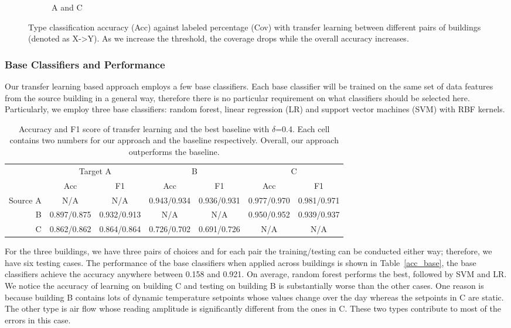 \begin{figure}[ht!]
\begin{subfigure}{0.32\textwidth}
                \caption{A and C}
  \end{subfigure}
\caption{Type classification accuracy (Acc) against labeled percentage (Cov) with transfer learning between different pairs of buildings (denoted as X->Y). As we increase the threshold, the coverage drops while the overall accuracy increases. }
\label{fig:tl_acc}
\end{figure}


\subsubsection{Base Classifiers and Performance}
\label{sec:baseline}
Our transfer learning based approach employs a few base classifiers. Each base classifier will be trained on the same set of data features from the source building in a general way, therefore there is no particular requirement on what classifiers should be selected here.
Particularly, we employ three base classifiers: random forest, linear regression (LR) and support vector machines (SVM) with RBF kernels.


\begin{table}[]
\centering
\begin{tabular}{r|c|c|c|c|c|c}
\hline
\multirow{2}{*}{} & \multicolumn{2}{c|}{Target A} & \multicolumn{2}{c|}{B} & \multicolumn{2}{c}{C} \\ \cline{2-7} 
                  & Acc        & F1        & Acc        & F1        & Acc        & F1        \\ \hline
Source A                 & N/A      & N/A     & 0.943/0.934      & 0.936/0.931     & 0.977/0.970      & 0.981/0.971     \\ \hline
B                 & 0.897/0.875     & 0.932/0.913     & N/A      & N/A     & 0.950/0.952      & 0.939/0.937     \\ \hline
C                 & 0.862/0.862     & 0.864/0.864     & 0.726/0.702      & 0.691/0.726     & N/A     & N/A     \\ \hline
\end{tabular}
\caption{Accuracy and F1 score of transfer learning and the best baseline with $\delta$=0.4. Each cell contains two numbers for our approach and the baseline respectively. Overall, our approach outperforms the baseline.}
\label{table:f1}
\end{table}

For the three buildings, we have three pairs of choices and for each pair the training/testing can be conducted either way; therefore, we have six testing cases.
The performance of the base classifiers when applied across buildings is shown in Table~\ref{acc_base}, the base classifiers achieve the accuracy anywhere between 0.158 and 0.921.
On average, random forest performs the best, followed by SVM and LR. 
We notice the accuracy of learning on building C and testing on building B is substantially worse than the other cases. 
One reason is because building B contains lots of dynamic temperature setpoints whose values change over the day whereas the setpoints in C are static. The other type is air flow whose reading amplitude is significantly different from the ones in C. These two types contribute to most of the errors in this case.


